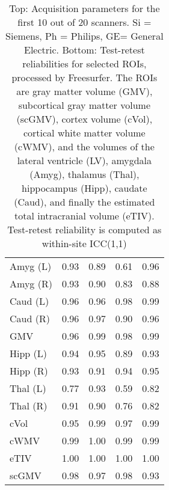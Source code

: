 \begin{table}
\begin{tabular}{lllll}
Amyg (L)              &               0.93 &               0.89 &                 0.61 &                 0.96 \\
Amyg (R)              &               0.93 &               0.90 &                 0.83 &                 0.88 \\
Caud (L)              &               0.96 &               0.96 &                 0.98 &                 0.99 \\
Caud (R)              &               0.96 &               0.97 &                 0.90 &                 0.96 \\
GMV                   &               0.96 &               0.99 &                 0.98 &                 0.99 \\
Hipp (L)              &               0.94 &               0.95 &                 0.89 &                 0.93 \\
Hipp (R)              &               0.93 &               0.91 &                 0.94 &                 0.95 \\
Thal (L)              &               0.77 &               0.93 &                 0.59 &                 0.82 \\
Thal (R)              &               0.91 &               0.90 &                 0.76 &                 0.82 \\
cVol                  &               0.95 &               0.99 &                 0.97 &                 0.99 \\
cWMV                  &               0.99 &               1.00 &                 0.99 &                 0.99 \\
eTIV                  &               1.00 &               1.00 &                 1.00 &                 1.00 \\
scGMV                 &               0.98 &               0.97 &                 0.98 &                 0.93 \\
\bottomrule
\end{tabular}
\caption{Top: Acquisition parameters for the first 10 out of 20 scanners. Si = Siemens, Ph = Philips, GE= General Electric. Bottom: Test-retest reliabilities for selected ROIs, processed by Freesurfer. The ROIs are gray matter volume (GMV), subcortical gray matter volume (scGMV), cortex volume (cVol), cortical white matter volume (cWMV), and the volumes of the lateral ventricle (LV), amygdala (Amyg), thalamus (Thal), hippocampus (Hipp), caudate (Caud), and finally the estimated total intracranial volume (eTIV). Test-retest reliability is computed as within-site ICC(1,1)} 
\label{tab:acquisition1}

\end{table}